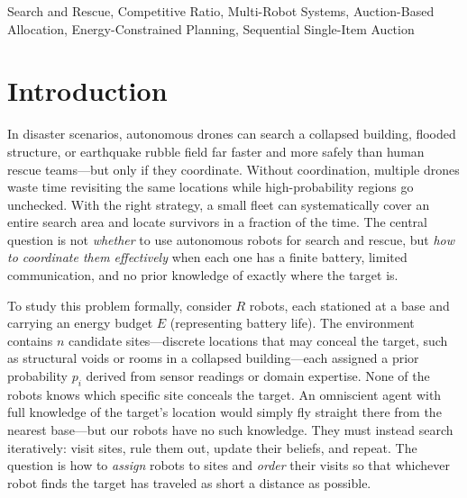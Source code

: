 \documentclass[conference]{IEEEtran}
\begin{document}
\begin{IEEEkeywords}
Search and Rescue, Competitive Ratio, Multi-Robot Systems, Auction-Based Allocation,
Energy-Constrained Planning, Sequential Single-Item Auction
\end{IEEEkeywords}

\section{Introduction}\label{sec:intro}

In disaster scenarios, autonomous drones can search a collapsed building,
flooded structure, or earthquake rubble field far faster and more safely
than human rescue teams---but only if they coordinate.
Without coordination, multiple drones waste time revisiting the same
locations while high-probability regions go unchecked.
With the right strategy, a small fleet can systematically cover an entire
search area and locate survivors in a fraction of the time.
The central question is not \emph{whether} to use autonomous robots for
search and rescue, but \emph{how to coordinate them effectively} when each
one has a finite battery, limited communication, and no prior knowledge of
exactly where the target is.

To study this problem formally, consider $R$ robots, each stationed at a
base and carrying an energy budget $E$ (representing battery life).
The environment contains $n$ candidate sites---discrete locations that may
conceal the target, such as structural voids or rooms in a collapsed
building---each assigned a prior probability $p_i$ derived from sensor
readings or domain expertise.
None of the robots knows which specific site conceals the target.
An omniscient agent with full knowledge of the target's location would
simply fly straight there from the nearest base---but our robots have no
such knowledge.
They must instead search iteratively: visit sites, rule them out, update
their beliefs, and repeat.
The question is how to \emph{assign} robots to sites and \emph{order} their
visits so that whichever robot finds the target has traveled as short a
distance as possible.
\end{document}
